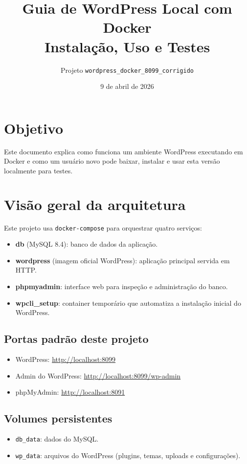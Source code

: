 ﻿\documentclass[12pt,a4paper]{article}
\title{Guia de WordPress Local com Docker\\\large Instala\c{c}\~ao, Uso e Testes}
\author{Projeto \texttt{wordpress\_docker\_8099\_corrigido}}
\date{9 de abril de 2026}
\begin{document}
\maketitle
\tableofcontents
\newpage

\section{Objetivo}
Este documento explica como funciona um ambiente WordPress executando em Docker e como um usu\'ario novo pode baixar, instalar e usar esta vers\~ao localmente para testes.

\section{Vis\~ao geral da arquitetura}
Este projeto usa \texttt{docker-compose} para orquestrar quatro servi\c{c}os:
\begin{itemize}
  \item \textbf{db} (MySQL 8.4): banco de dados da aplica\c{c}\~ao.
  \item \textbf{wordpress} (imagem oficial WordPress): aplica\c{c}\~ao principal servida em HTTP.
  \item \textbf{phpmyadmin}: interface web para inspe\c{c}\~ao e administra\c{c}\~ao do banco.
  \item \textbf{wpcli\_setup}: container tempor\'ario que automatiza a instala\c{c}\~ao inicial do WordPress.
\end{itemize}

\subsection{Portas padr\~ao deste projeto}
\begin{itemize}
  \item WordPress: \url{http://localhost:8099}
  \item Admin do WordPress: \url{http://localhost:8099/wp-admin}
  \item phpMyAdmin: \url{http://localhost:8091}
\end{itemize}

\subsection{Volumes persistentes}
\begin{itemize}
  \item \texttt{db\_data}: dados do MySQL.
  \item \texttt{wp\_data}: arquivos do WordPress (plugins, temas, uploads e configura\c{c}\~oes).
\end{itemize}
\end{document}
